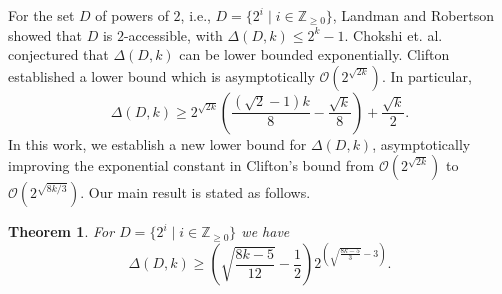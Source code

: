 \documentclass[11pt]{article}
\newtheorem{theorem}{Theorem}
\begin{document}
For the set $D$ of powers of $2$, i.e., $D = \{ 2^i \mid i \in \mathbb{Z}_{\ge 0}\}$, Landman and Robertson \cite{LR} showed that $D$ is $2$-accessible, with $\Delta(D,k) \le 2^k - 1$. Chokshi et. al. \cite{CCLS18} conjectured that $\Delta(D,k)$ can be lower bounded exponentially. Clifton \cite{Clifton} established a lower bound which is asymptotically $\mathcal{O}(2^{\sqrt{2k}})$. In particular,
\begin{equation}
    \Delta(D, k) \geq 2^{\sqrt{2k}} \left( \frac{(\sqrt{2} - 1)k}{8} - \frac{\sqrt{k}}{8} \right) + \frac{\sqrt{k}}{2}.
\end{equation}
In this work, we establish a new lower bound for $\Delta(D,k)$, asymptotically improving the exponential constant in Clifton's bound from $\mathcal{O}(2^{\sqrt{2k}})$ to $\mathcal{O}(2^{\sqrt{8k/3}})$. Our main result is stated as follows.  
\begin{theorem}\label{thm: MainThm}
    For $D=\{2^i\mid i\in\mathbb{Z}_{\ge0}\}$ we have
    \begin{equation}\label{Theone}
        \Delta(D,k)\ge \left(\sqrt{\frac{8k-5}{12}}-\frac12\right)2^{\left(\sqrt{\frac{8k-5}{3}}-3\right)}.
    \end{equation}
\end{theorem}




\end{document}

